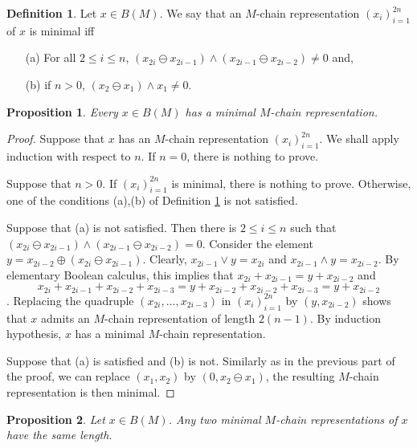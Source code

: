 \documentclass{amsart}
\newtheorem{proposition}{Proposition}
\theoremstyle{definition}
\newtheorem{definition}{Definition}
\begin{document}
\begin{definition}
\label{def:minimal}
Let $x\in B(M)$.
We say that an $M$-chain representation $(x_i)_{i=1}^{2n}$ 
of $x$ is minimal iff
\begin{enumerate}
\item[(a)] For all $2\leq i\leq n$, 
$(x_{2i}\ominus x_{2i-1})\wedge(x_{2i-1}\ominus x_{2i-2})\neq0$ and,
\item[(b)] if $n>0$, $(x_2\ominus x_1)\wedge x_1\neq 0$.
\end{enumerate}
\end{definition}
\begin{proposition}
Every $x\in B(M)$ has a minimal $M$-chain representation.
\end{proposition}
\begin{proof}
Suppose that $x$ has an $M$-chain representation $(x_i)_{i=1}^{2n}$.
We shall apply induction with respect to $n$. If $n=0$, there is nothing to prove.

Suppose that $n>0$. If $(x_i)_{i=1}^{2n}$ is minimal, there is nothing to prove.
Otherwise, one of the conditions (a),(b) of Definition \ref{def:minimal} is not
satisfied.

Suppose that (a) is not satisfied. Then there is $2\leq i\leq n$ such that
$(x_{2i}\ominus x_{2i-1})\wedge(x_{2i-1}\ominus x_{2i-2})=0$. Consider the
element $y=x_{2i-2}\oplus(x_{2i}\ominus x_{2i-1})$.
Clearly, $x_{2i-1}\vee y=x_{2i}$ and $x_{2i-1}\wedge y=x_{2i-2}$.
By elementary Boolean calculus, this implies
that $x_{2i}+x_{2i-1}=y+x_{2i-2}$ and
$$
x_{2i}+x_{2i-1}+x_{2i-2}+x_{2i-3}=y+x_{2i-2}+x_{2i-2}+x_{2i-3}=y+x_{2i-2}
$$.
Replacing the quadruple $(x_{2i},\dots,x_{2i-3})$ in $(x_i)_{i=1}^{2n}$
by $(y,x_{2i-2})$ shows that $x$ admits an $M$-chain representation
of length $2(n-1)$. By induction hypothesis, $x$ has a minimal
$M$-chain representation.

Suppose that (a) is satisfied and (b) is not. Similarly as in the
previous part of the proof, we can replace $(x_1,x_2)$ by 
$(0,x_2\ominus x_1)$, the resulting $M$-chain representation is then minimal.

\end{proof}
\begin{proposition}
Let $x\in B(M)$. Any two minimal $M$-chain representations of $x$ have the
same length.
\end{proposition}
\end{document}
